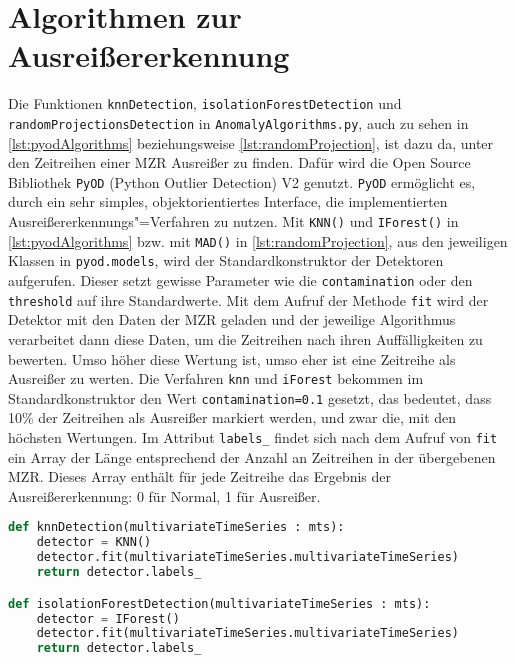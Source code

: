 \section{Algorithmen zur Ausreißererkennung}
Die Funktionen \lstinline|knnDetection|, \lstinline|isolationForestDetection| und \texttt{randomProjectionsDetec\allowbreak tion} in \texttt{AnomalyAlgorithms.py}, auch zu sehen in \autoref{lst:pyodAlgorithms} beziehungsweise \autoref{lst:randomProjection}, ist dazu da, unter den Zeitreihen einer \ac{MZR} Ausreißer zu finden. Dafür wird die Open Source Bibliothek \lstinline|PyOD| (Python Outlier Detection) V2 \cite{pyod} genutzt. \lstinline|PyOD| ermöglicht es, durch ein sehr simples, objektorientiertes Interface, die implementierten Ausreißererkennungs"=Verfahren zu nutzen. Mit \lstinline|KNN()| und \lstinline|IForest()| in \autoref{lst:pyodAlgorithms} bzw. mit \lstinline|MAD()| in \autoref{lst:randomProjection}, aus den jeweiligen Klassen in \lstinline|pyod.models|, wird der Standardkonstruktor der Detektoren aufgerufen. Dieser setzt gewisse Parameter wie die \lstinline|contamination| oder den \lstinline|threshold| auf ihre Standardwerte. Mit dem Aufruf der Methode \lstinline|fit| wird der Detektor mit den Daten der \ac{MZR} geladen und der jeweilige Algorithmus verarbeitet dann diese Daten, um die Zeitreihen nach ihren Auffälligkeiten zu bewerten. Umso höher diese Wertung ist, umso eher ist eine Zeitreihe als Ausreißer zu werten. Die Verfahren \lstinline|knn| und \lstinline|iForest| bekommen im Standardkonstruktor den Wert \lstinline|contamination=0.1| gesetzt, das bedeutet, dass 10\% der Zeitreihen als Ausreißer markiert werden, und zwar die, mit den höchsten Wertungen. Im Attribut \lstinline|labels_| findet sich nach dem Aufruf von \lstinline|fit| ein Array der Länge entsprechend der Anzahl an Zeitreihen in der übergebenen \ac{MZR}. Dieses Array enthält für jede Zeitreihe das Ergebnis der Ausreißererkennung: 0 für Normal, 1 für Ausreißer.
\begin{lstlisting}[caption={knn"= und iForest"=Detection}, label=lst:pyodAlgorithms, style=Python, language=Python]
def knnDetection(multivariateTimeSeries : mts):
    detector = KNN()
    detector.fit(multivariateTimeSeries.multivariateTimeSeries)
    return detector.labels_

def isolationForestDetection(multivariateTimeSeries : mts):
    detector = IForest()
    detector.fit(multivariateTimeSeries.multivariateTimeSeries)
    return detector.labels_
\end{lstlisting}

